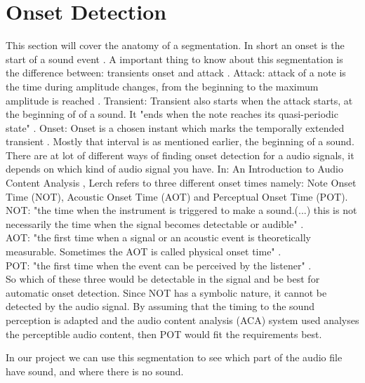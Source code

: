 \section{Onset Detection}
This section  will cover the anatomy of a segmentation.
In short an onset is the start of a sound event \citep{ACA}. 
A important thing to know about this segmentation is the difference between: transients onset and attack \citep{Bello2005}.
Attack: attack of a note is the time during amplitude changes, from the beginning to the maximum amplitude is reached \citep{ACA}.
Transient: Transient also starts when the attack starts, at the beginning of of a sound\citep{Bello2005}. It "ends when the note reaches its quasi-periodic state" \citep{ACA}.
Onset: Onset is a chosen instant which marks the temporally extended transient \citep{Bello2005}. Mostly that interval is as mentioned earlier, the beginning of a sound. 
\\
There are at lot of different ways of finding onset detection for a audio signals, it depends on which kind of audio signal you have\citep{Bello2005}. 
In: An Introduction to Audio Content Analysis \citep{ACA}, Lerch refers to three different onset times namely: Note Onset Time (NOT), Acoustic Onset Time (AOT) and Perceptual Onset Time (POT)\citep{ACA}.
\\
NOT: "the time when the instrument is triggered to make a sound.(...) this is not necessarily the time when the signal becomes detectable or audible" \citep{ACA}.
\\
AOT: "the first time when a signal or an acoustic event is theoretically measurable. Sometimes the AOT is called physical onset time" \citep{ACA}.
\\
POT: "the first time when the event can be perceived by the
listener" \citep{ACA}.
\\
So which of these three would be detectable in the signal and be best for automatic onset detection. Since NOT has a symbolic nature, it cannot be detected by the audio signal\cite{ACA}. By assuming that the timing to the sound perception is adapted and the audio content analysis (ACA) system used analyses the perceptible audio content, then POT would fit the requirements best\cite{ACA}.

In our project we can use this segmentation to see which part of the audio file have sound, and where there is no sound. 
